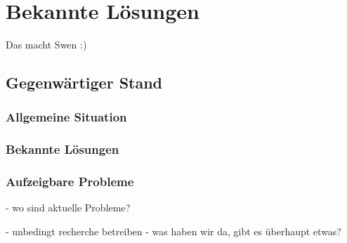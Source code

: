\chapter{Bekannte Lösungen}
Das macht Swen :) 

\section{Gegenwärtiger Stand}
\subsection{Allgemeine Situation}
\subsection{Bekannte Lösungen}
\subsection{Aufzeigbare Probleme}
- wo sind aktuelle Probleme?

- unbedingt recherche betreiben 
- was haben wir da, gibt es überhaupt etwas? 
